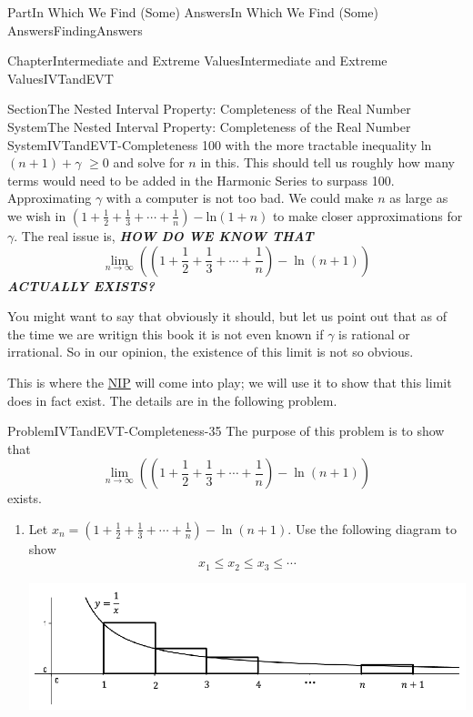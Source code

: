 \documentclass[oneside,10pt,]{book}
\newcommand{\alert}[1]{\textbf{\textit{#1}}}
\numberwithin{equation}{part}
\def\limit#1#2#3{{\displaystyle\lim_{#1\rightarrow #2}#3}}
\begin{document}
\begin{partptx}{Part}{In Which We Find (Some) Answers}{}{In Which We Find (Some) Answers}{}{}{FindingAnswers}
\begin{chapterptx}{Chapter}{Intermediate and Extreme Values}{}{Intermediate and Extreme Values}{}{}{IVTandEVT}
\begin{sectionptx}{Section}{The Nested Interval Property: Completeness of the Real Number System}{}{The Nested Interval Property: Completeness of the Real Number System}{}{}{IVTandEVT-Completeness}
100\) with the more tractable inequality ln\(\left(n+1\right)+\gamma\) \(\geq 0\) and solve for \(n\) in this.  This should tell us roughly how many terms would need to be added in the Harmonic Series to surpass 100. Approximating \(\gamma\) with a computer is not too bad.  We could make \(n\) as large as we wish in \(\left(1+\frac{1}{2}+\frac{1}{3}+\cdots+\frac{1}{n}\right)-\)ln\(\left(1+n\right)\) to make closer approximations for \(\gamma\).  The real issue is, \alert{HOW DO WE KNOW THAT}%
\begin{equation*}
\limit{n}{\infty}{\left(\left(1+\frac{1}{2}+\frac{1}{3}+\cdots+
\frac{1}{n}\right)-\ln(n+1)\right)}
\end{equation*}
\alert{ACTUALLY EXISTS?}%
\par
You might want to say that obviously it should, but let us point out that as of the time we are writign this book it is not even known if \(\gamma\) is rational or irrational.  So in our opinion, the existence of this limit is not so obvious.%
\par
This is where the \hyperref[NIP]{NIP} will come into play; we will use it to show that this limit does in fact exist.  The details are in the following problem.%
\begin{problem}{Problem}{}{IVTandEVT-Completeness-35}%
The purpose of this problem is to show that%
\begin{equation*}
\lim_{n\rightarrow\infty}\left(\left(1+\frac{1}{2}+\frac{1}{3}+\cdots+ \frac{1}{n}\right)-\ln\left(n+1\right)\right)
\end{equation*}
exists.%
\begin{enumerate}[font=\bfseries,label=(\alph*),ref=\alph*]%
\item{}Let \(x_n=\left(1+\frac{1}{2}+\frac{1}{3}+\cdots+\frac{1}{n}\right)-\ln\left(n+1
\right)\).  Use the following diagram to show%
\begin{equation*}
x_1\leq x_2\leq x_3\leq\cdots
\end{equation*}
%
\begin{image}{0.08}{0.84}{0.08}{}%
\includegraphics[width=\linewidth]{external/images/Ch6fig7.png}
\end{image}%

\end{enumerate}
\end{problem}
\end{sectionptx}
\end{chapterptx}
\end{partptx}
\end{document}
